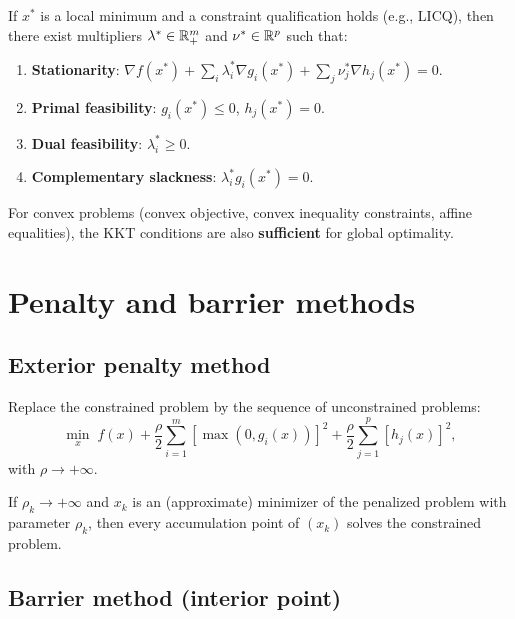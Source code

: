 \begin{theorem}
If $x^*$ is a local minimum and a constraint qualification holds (e.g., LICQ),
then there exist multipliers $\lambda^* \in \mathbb{R}^m_+$ and $\nu^* \in \mathbb{R}^p$
such that:
\begin{enumerate}
  \item \textbf{Stationarity}:
        $\nabla f(x^*) + \sum_{i} \lambda_i^* \nabla g_i(x^*)
        + \sum_{j} \nu_j^* \nabla h_j(x^*) = 0$.
  \item \textbf{Primal feasibility}: $g_i(x^*) \leq 0$, $h_j(x^*) = 0$.
  \item \textbf{Dual feasibility}: $\lambda_i^* \geq 0$.
  \item \textbf{Complementary slackness}: $\lambda_i^* g_i(x^*) = 0$.
\end{enumerate}
\end{theorem}

\begin{remark}
For convex problems (convex objective, convex inequality constraints, affine
equalities), the KKT conditions are also \textbf{sufficient} for global
optimality.
\end{remark}

\section{Penalty and barrier methods}

\subsection{Exterior penalty method}

\begin{definition}
Replace the constrained problem by the sequence of unconstrained problems:
\[
  \min_{x}\; f(x) + \frac{\rho}{2} \sum_{i=1}^m [\max(0, g_i(x))]^2
  + \frac{\rho}{2} \sum_{j=1}^p [h_j(x)]^2,
\]
with $\rho \to +\infty$.
\end{definition}

\begin{theorem}
If $\rho_k \to +\infty$ and $x_k$ is an (approximate) minimizer of the
penalized problem with parameter $\rho_k$, then every accumulation point of
$(x_k)$ solves the constrained problem.
\end{theorem}

\subsection{Barrier method (interior point)}

